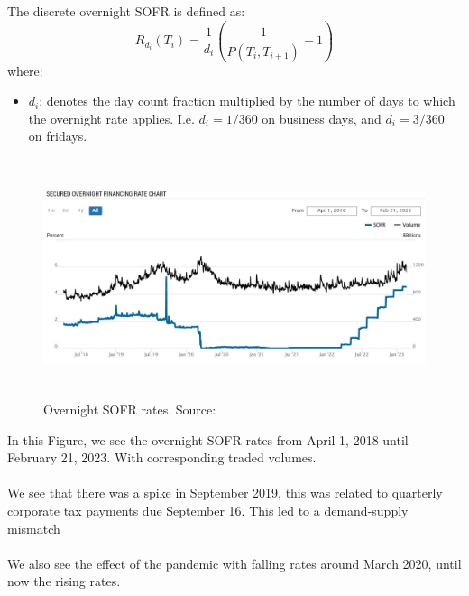 \newpage 

\begin{definition}
The discrete overnight SOFR is defined as:
\[
R_{d_{i}}(T_{i}) = \frac{1}{d_{i}}\left(
\frac{1}{P(T_{i}, T_{i+1})} - 1
\right)
\]
where:
\begin{itemize}[leftmargin=*]
    \item $d_{i}$: denotes the day count fraction multiplied by the number of days to which the overnight rate applies. I.e. $d_{i} = 1/360$ on business days, and $d_{i} = 3/360$ on fridays. 
\end{itemize}
\end{definition}


\begin{figure}[htp]
    \centering
    \includegraphics[height = 7cm, width=14cm]{figures/SOFR/overnight_SOFR_Volume.JPG}
    \caption{Overnight SOFR rates. Source: \cite{NewYorkFedSOFR}}
    \label{fig: Overnight_SOFR_rates}
\end{figure}

In this Figure, we see the overnight SOFR rates from April 1, 2018 until February 21, 2023. With corresponding traded volumes. 
\\~\\
We see that there was a spike in September 2019, this was related to quarterly corporate tax payments due September 16. This led to a demand-supply mismatch  \cite{FederalReserve2019}
\\~\\ 
We also see the effect of the pandemic with falling rates around March 2020, until now the rising rates. 


\newpage 

